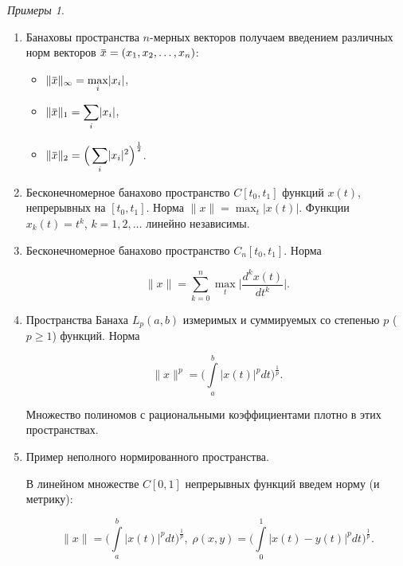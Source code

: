 \documentclass[12pt,a4paper,titlepage,oneside]{book}
\newcommand{\overbar}[1]{\mkern 1.5mu\overline{\mkern-1.5mu#1\mkern-1.5mu}\mkern 1.5mu}
\theoremstyle{definition}
\theoremstyle{plain}
\theoremstyle{break}
\theoremstyle{remark}
\theoremstyle{remark}
\theoremstyle{remark}
\newtheorem*{examples}{Примеры}
\theoremstyle{remark}
\theoremstyle{plain}
\theoremstyle{plain}
\begin{document}
\begin{examples}
\leavevmode
\begin{enumerate}

	\item Банаховы пространства $n$-мерных векторов получаем введением различных норм векторов $\overbar{x} = (x_1,x_2,\ldots,x_n)$:

	\begin{itemize}

		\item $\lVert \overbar{x}\rVert_\infty=\displaystyle\max_{i}\lvert x_i\rvert$,

		\item $\lVert \overbar{x}\rVert_1 = \displaystyle\sum_{i}\lvert x_i\rvert$,

		\item $\lVert \overbar{x}\rVert_2 = \Big( \displaystyle\sum_{i}\lvert x_i\rvert^2 \Big)^{\frac{1}{2}}$.

	\end{itemize}

	\item Бесконечномерное банахово пространство $C[t_0,t_1]$ функций $x(t)$, непрерывных на $[t_0,t_1]$. Норма $\lVert x\rVert = \displaystyle\max_{t}\lvert x(t)\rvert$.
	Функции $x_k(t)=t^k$, $k=1,2,\ldots$ линейно независимы.

	\item Бесконечномерное банахово пространство $C_n[t_0,t_1]$. Норма

	\begin{equation*}
	\lVert x\rVert = \displaystyle\sum_{k=0}^n \max_{t} \Big\lvert\frac{d^kx(t)}{dt^k} \Big\rvert.
	\end{equation*}

	\item Пространства Банаха $L_p(a,b)$ измеримых и суммируемых со степенью $p$ ($p \geqslant 1$) функций. Норма

	\begin{equation*}
	\lVert x\rVert^p = \Big(\int\limits_a^b\lvert x(t)\rvert^p dt \Big)^{\frac{1}{p}}.
	\end{equation*}

	Множество полиномов с рациональными коэффициентами плотно в этих пространствах.

	\item Пример неполного нормированного пространства.

	В линейном множестве $C[0,1]$ непрерывных функций введем норму (и метрику):

	\begin{equation*}
	\lVert x\rVert = \Big(\int\limits_a^b\lvert x(t)\rvert^pdt \Big)^{\frac{1}{p}}, \; \rho(x,y) = \Big(\int\limits_0^1\lvert x(t)-y(t)\rvert^pdt \Big)^{\frac{1}{p}}.
	\end{equation*}


\end{enumerate}
\end{examples}
\end{document}
